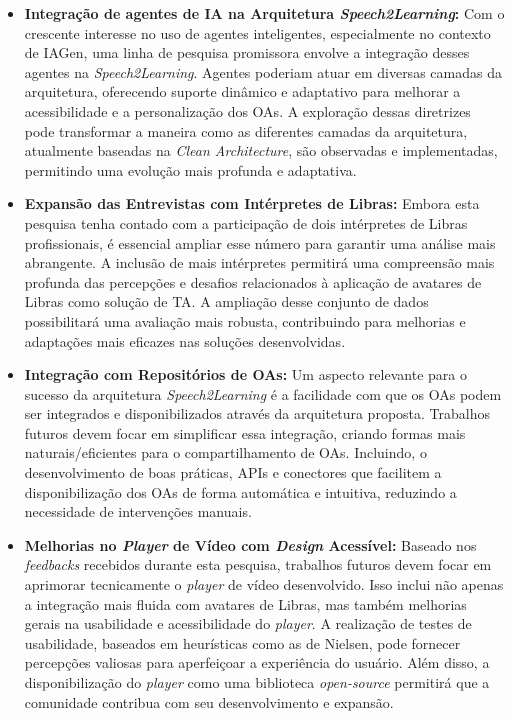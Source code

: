 \begin{itemize}

    \item \textbf{Integração de agentes de IA na Arquitetura \textit{Speech2Learning}:} Com o crescente interesse no uso de agentes inteligentes, especialmente no contexto de IAGen, uma linha de pesquisa promissora envolve a integração desses agentes na \textit{Speech2Learning}. Agentes poderiam atuar em diversas camadas da arquitetura, oferecendo suporte dinâmico e adaptativo para melhorar a acessibilidade e a personalização dos OAs. A exploração dessas diretrizes pode transformar a maneira como as diferentes camadas da arquitetura, atualmente baseadas na \textit{Clean Architecture}, são observadas e implementadas, permitindo uma evolução mais profunda e adaptativa.

    \item \textbf{Expansão das Entrevistas com Intérpretes de Libras:} Embora esta pesquisa tenha contado com a participação de dois intérpretes de Libras profissionais, é essencial ampliar esse número para garantir uma análise mais abrangente. A inclusão de mais intérpretes permitirá uma compreensão mais profunda das percepções e desafios relacionados à aplicação de avatares de Libras como solução de TA. A ampliação desse conjunto de dados possibilitará uma avaliação mais robusta, contribuindo para melhorias e adaptações mais eficazes nas soluções desenvolvidas.

    \item \textbf{Integração com Repositórios de OAs:} Um aspecto relevante para o sucesso da arquitetura \textit{Speech2Learning} é a facilidade com que os OAs podem ser integrados e disponibilizados através da arquitetura proposta. Trabalhos futuros devem focar em simplificar essa integração, criando formas mais naturais/eficientes para o compartilhamento de OAs. Incluindo, o desenvolvimento de boas práticas, APIs e conectores que facilitem a disponibilização dos OAs de forma automática e intuitiva, reduzindo a necessidade de intervenções manuais.

    \item \textbf{Melhorias no \textit{Player} de Vídeo com \textit{Design} Acessível:} Baseado nos \textit{feedbacks} recebidos durante esta pesquisa, trabalhos futuros devem focar em aprimorar tecnicamente o \textit{player} de vídeo desenvolvido. Isso inclui não apenas a integração mais fluida com avatares de Libras, mas também melhorias gerais na usabilidade e acessibilidade do \textit{player}. A realização de testes de usabilidade, baseados em heurísticas como as de Nielsen, pode fornecer percepções valiosas para aperfeiçoar a experiência do usuário. Além disso, a disponibilização do \textit{player} como uma biblioteca \textit{open-source} permitirá que a comunidade contribua com seu desenvolvimento e expansão.


\end{itemize}
